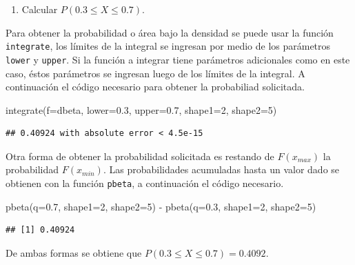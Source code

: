 \documentclass[
]{book}
\makeatletter
\newenvironment{Shaded}{\begin{snugshade}}{\end{snugshade}}
\newcommand{\AttributeTok}[1]{\textcolor[rgb]{0.77,0.63,0.00}{#1}}
\newcommand{\DecValTok}[1]{\textcolor[rgb]{0.00,0.00,0.81}{#1}}
\newcommand{\FloatTok}[1]{\textcolor[rgb]{0.00,0.00,0.81}{#1}}
\newcommand{\FunctionTok}[1]{\textcolor[rgb]{0.00,0.00,0.00}{#1}}
\newcommand{\NormalTok}[1]{#1}
\newcommand{\SpecialCharTok}[1]{\textcolor[rgb]{0.00,0.00,0.00}{#1}}
\providecommand{\tightlist}{%
  \setlength{\itemsep}{0pt}\setlength{\parskip}{0pt}}
\newenvironment{kframe}{%
\medskip{}
\setlength{\fboxsep}{.8em}
 \def\at@end@of@kframe{}%
 \ifinner\ifhmode%
  \def\at@end@of@kframe{\end{minipage}}%
  \begin{minipage}{\columnwidth}%
 \fi\fi%
 \def\FrameCommand##1{\hskip\@totalleftmargin \hskip-\fboxsep
 \colorbox{shadecolor}{##1}\hskip-\fboxsep
     \hskip-\linewidth \hskip-\@totalleftmargin \hskip\columnwidth}%
 \MakeFramed {\advance\hsize-\width
   \@totalleftmargin\z@ \linewidth\hsize
   \@setminipage}}%
 {\par\unskip\endMakeFramed%
 \at@end@of@kframe}
\renewenvironment{Shaded}{\begin{kframe}}{\end{kframe}}
\makeatother
\begin{document}
\begin{enumerate}
\def\labelenumi{\arabic{enumi})}
\setcounter{enumi}{1}
\tightlist
\item
  Calcular \(P(0.3 \leq X \leq 0.7)\).
\end{enumerate}

Para obtener la probabilidad o área bajo la densidad se puede usar la función \texttt{integrate}, los límites de la integral se ingresan por medio de los parámetros \texttt{lower} y \texttt{upper}. Si la función a integrar tiene parámetros adicionales como en este caso, éstos parámetros se ingresan luego de los límites de la integral. A continuación el código necesario para obtener la probabiliad solicitada.

\begin{Shaded}
\begin{Highlighting}[]
\FunctionTok{integrate}\NormalTok{(}\AttributeTok{f=}\NormalTok{dbeta, }\AttributeTok{lower=}\FloatTok{0.3}\NormalTok{, }\AttributeTok{upper=}\FloatTok{0.7}\NormalTok{,}
          \AttributeTok{shape1=}\DecValTok{2}\NormalTok{, }\AttributeTok{shape2=}\DecValTok{5}\NormalTok{)}
\end{Highlighting}
\end{Shaded}

\begin{verbatim}
## 0.40924 with absolute error < 4.5e-15
\end{verbatim}

Otra forma de obtener la probabilidad solicitada es restando de \(F(x_{max})\) la probabilidad \(F(x_{min})\). Las probabilidades acumuladas hasta un valor dado se obtienen con la función \texttt{pbeta}, a continuación el código necesario.

\begin{Shaded}
\begin{Highlighting}[]
\FunctionTok{pbeta}\NormalTok{(}\AttributeTok{q=}\FloatTok{0.7}\NormalTok{, }\AttributeTok{shape1=}\DecValTok{2}\NormalTok{, }\AttributeTok{shape2=}\DecValTok{5}\NormalTok{) }\SpecialCharTok{{-}} \FunctionTok{pbeta}\NormalTok{(}\AttributeTok{q=}\FloatTok{0.3}\NormalTok{, }\AttributeTok{shape1=}\DecValTok{2}\NormalTok{, }\AttributeTok{shape2=}\DecValTok{5}\NormalTok{)}
\end{Highlighting}
\end{Shaded}

\begin{verbatim}
## [1] 0.40924
\end{verbatim}

De ambas formas se obtiene que \(P(0.3 \leq X \leq 0.7)=0.4092\).
\end{document}
